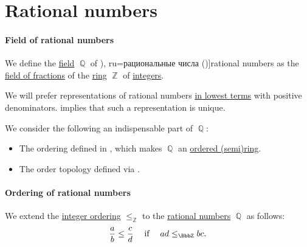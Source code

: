 \section{Rational numbers}\label{sec:rational_numbers}

\paragraph{Field of rational numbers}

\begin{definition}\label{def:rational_numbers}
  We define the \hyperref[def:field]{field} \( \BbbQ \) of \term[bg=рационални числа (\cite[18]{Тагамлицки1971Диф}), ru=рациональные числа (\cite[def. 22.1]{АлександровМаркушевичХинчин1951ЭнциклопедияТом1})]{rational numbers} as the \hyperref[def:field_of_fractions]{field of fractions} of the \hyperref[def:ring]{ring} \( \BbbZ \) of \hyperref[def:integers]{integers}.
\end{definition}
\begin{comments}
  \item We will prefer representations of rational numbers \hyperref[def:lowest_terms]{in lowest terms} with positive denominators.  implies that such a representation is unique.

  \item We consider the following an indispensable part of \( \BbbQ \):
  \begin{itemize}
    \item The ordering defined in , which makes \( \BbbQ \) an \hyperref[def:ordered_semiring]{ordered (semi)ring}.
    \item The order topology defined via .
  \end{itemize}
\end{comments}

\paragraph{Ordering of rational numbers}

\begin{definition}\label{def:rational_numbers_ordering}
  We extend the \hyperref[def:integer_ordering]{integer ordering} \( \leq_\BbbZ \) to the \hyperref[def:rational_numbers]{rational numbers} \( \BbbQ \) as follows:
  \begin{equation*}
    \frac a b \leq \frac c d \quad\T{if}\quad ad \leq_\BbbZ bc.
  \end{equation*}
\end{definition}

